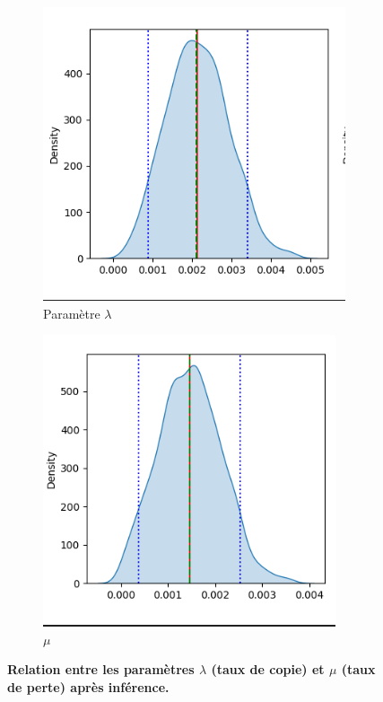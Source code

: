 \documentclass[a4paper,twoside,12pt]{book}
\begin{document}
\begin{figure}[H]
	\centering
	\begin{subfigure}{0.45\textwidth}
		\centering
		\includegraphics[width=\textwidth]{img/curvelambda.png}
		\caption{Paramètre $\lambda$}
		\label{fig:fig_simus_a}
	\end{subfigure}
	\hfill
	\begin{subfigure}{0.45\textwidth}
		\centering
		\includegraphics[width=\textwidth]{img/curvemu.png}
		\caption{$\mu$}
		\label{fig:fig_simus_b}
	\end{subfigure}
	\caption{\textbf{Relation entre les paramètres $\lambda$ (taux de copie) et $\mu$ (taux de perte) après inférence.}}
	\label{fig:fig_simus}
\end{figure}
\end{document}

